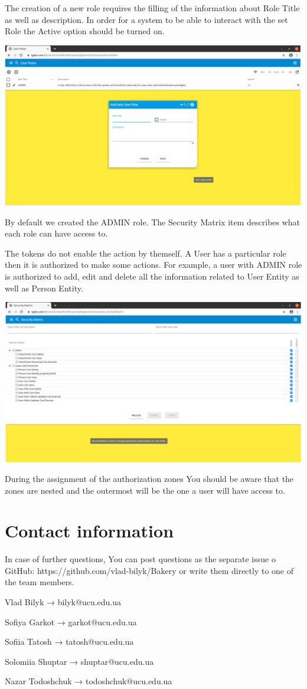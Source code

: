 The creation of a new role requires the filling of the information about Role Title as well as description. In order for a system to be able to interact with the set Role the Active option should be turned on.


\includegraphics[width=\textwidth]{sections/01-chapter/images/system4.png}

By default we created the ADMIN role. 
The Security Matrix item describes what each role can have access to. 

The tokens do not enable the action by themself. A User has a particular role then it is authorized to make some actions. For example, a user with ADMIN role is authorized to add, edit and delete all the information related to User Entity as well as Person Entity.  

\includegraphics[width=\textwidth]{sections/01-chapter/images/system5.png}

During the assignment of the authorization zones You should be aware that the zones are nested and the outermost will be the one a user will have access to. 

\section{Contact information}
In case of further questions, You can post questions as the separate issue o GitHub: https://github.com/vlad-bilyk/Bakery or write them directly to one of the team members. 

Vlad Bilyk  →  bilyk@ucu.edu.ua

Sofiya Garkot  →  garkot@ucu.edu.ua

Sofiia Tatosh  →  tatosh@ucu.edu.ua

Solomiia Shuptar  →  shuptar@ucu.edu.ua

Nazar Todoshchuk  →  todoshchuk@ucu.edu.ua


